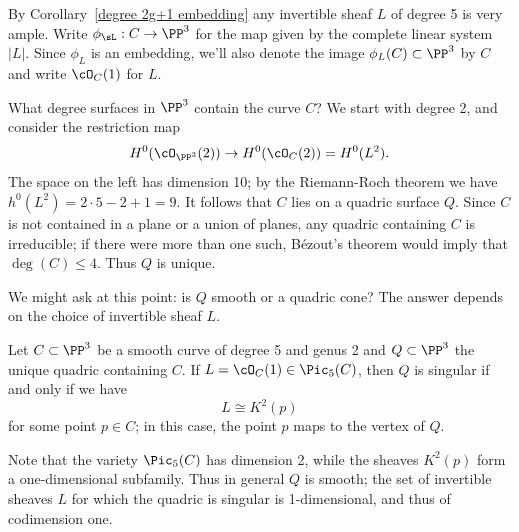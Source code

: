 By Corollary~\ref{degree 2g+1 embedding} any invertible sheaf $L$ of degree 5 is very ample. 
Write $\phi_\sL : C \to \PP^3$ for the map given by the complete linear system $|L|$. Since $\phi_L$ is an embedding, we'll also denote the image $\phi_L(C) \subset \PP^3$ by $C$ and write $\cO_C(1)$ for $L$.

What degree surfaces in $\PP^3$ contain the curve $C$? We start with degree 2, and consider the restriction map
$$
H^0(\cO_{\PP^3}(2)) \to H^0(\cO_C(2)) = H^0(L^2).
$$
The space on the left has dimension 10; by the Riemann-Roch theorem we have $h^0(L^2) = 2\cdot5 - 2 + 1 = 9$. It follows that $C$ lies on a quadric surface $Q$. Since $C$ is not contained in a plane or a union of planes, any quadric containing $C$ is irreducible; if there were more than one such, B\'ezout's theorem would imply that $\deg(C) \leq 4$. Thus $Q$ is unique.

We might ask at this point: is $Q$ smooth or a quadric cone? The answer depends on the choice of invertible sheaf $L$. 

\begin{proposition}\label{genus 2 embedding}
Let $C \subset \PP^3$ be a smooth curve of degree 5 and genus 2 and $Q \subset \PP^3$ the unique quadric containing $C$. If $L = \cO_C(1) \in \Pic_5(C)$, then $Q$ is singular if and only if we have
$$
L \cong K^2(p)
$$
for some point $p \in C$; in this case, the point $p$ maps to the vertex of $Q$.
\end{proposition}

Note that the variety $\Pic_5(C)$ has dimension 2, while the sheaves $K^2(p)$ form a one-dimensional subfamily. Thus in general $Q$ is smooth; the set of invertible sheaves $L$
for which the quadric is singular is 1-dimensional, and thus of codimension one.

